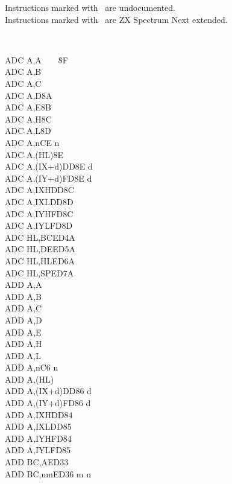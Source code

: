 Instructions marked with \UNDOC ~are undocumented.\\
Instructions marked with \ZXN ~are ZX Spectrum Next extended.
\setlength\columnsep{4em}
\begin{multicols}{3}
{
	\tt 
	\footnotesize
	\begin{tabbing}
		ADC A,A~~~~{\qquad}{\quad}\=8F\\
		ADC A,B\\
		ADC A,C\\
		ADC A,D\>8A\\
		ADC A,E\>8B\\
		ADC A,H\>8C\\
		ADC A,L\>8D\\
		ADC A,n\>CE n\\
		ADC A,(HL)\>8E\\
		ADC A,(IX+d)\>DD8E d\\
		ADC A,(IY+d)\>FD8E d\\
		ADC A,IXH\UNDOC\>DD8C\\
		ADC A,IXL\UNDOC\>DD8D\\
		ADC A,IYH\UNDOC\>FD8C\\
		ADC A,IYL\UNDOC\>FD8D\\
		ADC HL,BC\>ED4A\\
		ADC HL,DE\>ED5A\\
		ADC HL,HL\>ED6A\\
		ADC HL,SP\>ED7A\\
		ADD A,A\\
		ADD A,B\\
		ADD A,C\\
		ADD A,D\\
		ADD A,E\\
		ADD A,H\\
		ADD A,L\\
		ADD A,n\>C6 n\\
		ADD A,(HL)\\
		ADD A,(IX+d)\>DD86 d\\
		ADD A,(IY+d)\>FD86 d\\
		ADD A,IXH\UNDOC\>DD84\\
		ADD A,IXL\UNDOC\>DD85\\
		ADD A,IYH\UNDOC\>FD84\\
		ADD A,IYL\UNDOC\>FD85\\
		ADD BC,A\ZXN\>ED33\\
		ADD BC,nm\ZXN\>ED36	m n\\

\end{tabbing}}
\end{multicols}
